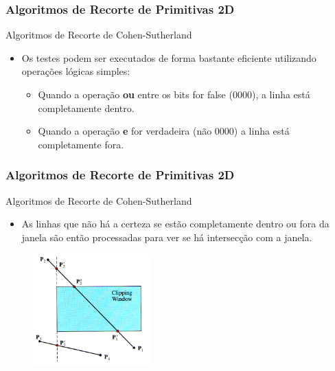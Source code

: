 \documentclass{beamer}
\begin{document}
\begin{frame}
\frametitle{Algoritmos de Recorte de Primitivas 2D}

	\begin{block}{Algoritmos de Recorte de Cohen-Sutherland}
		\begin{itemize}
			\item Os testes podem ser executados de forma bastante eficiente utilizando operações lógicas simples:
			\begin{itemize}
				\item Quando a operação \textbf{ou} entre os bits for false (0000), a linha está completamente dentro.
				\item Quando a operação \textbf{e} for verdadeira (não 0000) a linha está completamente fora.
			\end{itemize}
		\end{itemize}
	\end{block}
\end{frame}

\begin{frame}
\frametitle{Algoritmos de Recorte de Primitivas 2D}

	\begin{block}{Algoritmos de Recorte de Cohen-Sutherland}
		\begin{itemize}
			\item As linhas que não há a certeza se estão completamente dentro ou fora da janela são então processadas para ver se há intersecção com a janela.
		\end{itemize}
	\end{block}
	
	\begin{figure}[!h]
			\begin{center}
				\includegraphics[width=0.4\textwidth]{Figures/IntLin}
			\end{center}
	\end{figure}	
\end{frame}
\end{document}
